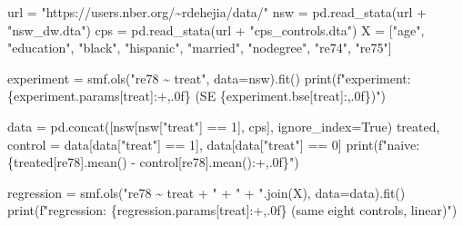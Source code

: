 \documentclass[
  letterpaper,
  10pt,
  twoside,
  openright,
  numbers=noenddot,
  chapterprefix=true]{scrbook}
\newenvironment{Shaded}{}{}
\newcommand{\BuiltInTok}[1]{\textcolor[rgb]{0.84,0.23,0.29}{#1}}
\newcommand{\DecValTok}[1]{\textcolor[rgb]{0.00,0.36,0.77}{#1}}
\newcommand{\NormalTok}[1]{\textcolor[rgb]{0.14,0.16,0.18}{#1}}
\newcommand{\OperatorTok}[1]{\textcolor[rgb]{0.14,0.16,0.18}{#1}}
\newcommand{\SpecialCharTok}[1]{\textcolor[rgb]{0.00,0.36,0.77}{#1}}
\newcommand{\SpecialStringTok}[1]{\textcolor[rgb]{0.01,0.18,0.38}{#1}}
\newcommand{\StringTok}[1]{\textcolor[rgb]{0.01,0.18,0.38}{#1}}
\newcommand{\VariableTok}[1]{\textcolor[rgb]{0.89,0.38,0.04}{#1}}
\begin{document}
\label{check-nsw-naive}
\begin{Shaded}
\begin{Highlighting}[]
\NormalTok{url }\OperatorTok{=} \StringTok{"https://users.nber.org/\textasciitilde{}rdehejia/data/"}
\NormalTok{nsw }\OperatorTok{=}\NormalTok{ pd.read\_stata(url }\OperatorTok{+} \StringTok{"nsw\_dw.dta"}\NormalTok{)}
\NormalTok{cps }\OperatorTok{=}\NormalTok{ pd.read\_stata(url }\OperatorTok{+} \StringTok{"cps\_controls.dta"}\NormalTok{)}
\NormalTok{X }\OperatorTok{=}\NormalTok{ [}\StringTok{"age"}\NormalTok{, }\StringTok{"education"}\NormalTok{, }\StringTok{"black"}\NormalTok{, }\StringTok{"hispanic"}\NormalTok{, }\StringTok{"married"}\NormalTok{, }\StringTok{"nodegree"}\NormalTok{, }\StringTok{"re74"}\NormalTok{, }\StringTok{"re75"}\NormalTok{]}

\NormalTok{experiment }\OperatorTok{=}\NormalTok{ smf.ols(}\StringTok{"re78 \textasciitilde{} treat"}\NormalTok{, data}\OperatorTok{=}\NormalTok{nsw).fit()}
\BuiltInTok{print}\NormalTok{(}\SpecialStringTok{f"experiment:  }\SpecialCharTok{\{}\NormalTok{experiment}\SpecialCharTok{.}\NormalTok{params[}\StringTok{\textquotesingle{}treat\textquotesingle{}}\NormalTok{]}\SpecialCharTok{:+,.0f\}}\SpecialStringTok{  (SE }\SpecialCharTok{\{}\NormalTok{experiment}\SpecialCharTok{.}\NormalTok{bse[}\StringTok{\textquotesingle{}treat\textquotesingle{}}\NormalTok{]}\SpecialCharTok{:,.0f\}}\SpecialStringTok{)"}\NormalTok{)}

\NormalTok{data }\OperatorTok{=}\NormalTok{ pd.concat([nsw[nsw[}\StringTok{"treat"}\NormalTok{] }\OperatorTok{==} \DecValTok{1}\NormalTok{], cps], ignore\_index}\OperatorTok{=}\VariableTok{True}\NormalTok{)}
\NormalTok{treated, control }\OperatorTok{=}\NormalTok{ data[data[}\StringTok{"treat"}\NormalTok{] }\OperatorTok{==} \DecValTok{1}\NormalTok{], data[data[}\StringTok{"treat"}\NormalTok{] }\OperatorTok{==} \DecValTok{0}\NormalTok{]}
\BuiltInTok{print}\NormalTok{(}\SpecialStringTok{f"naive:       }\SpecialCharTok{\{}\NormalTok{treated[}\StringTok{\textquotesingle{}re78\textquotesingle{}}\NormalTok{]}\SpecialCharTok{.}\NormalTok{mean() }\OperatorTok{{-}}\NormalTok{ control[}\StringTok{\textquotesingle{}re78\textquotesingle{}}\NormalTok{]}\SpecialCharTok{.}\NormalTok{mean()}\SpecialCharTok{:+,.0f\}}\SpecialStringTok{"}\NormalTok{)}

\NormalTok{regression }\OperatorTok{=}\NormalTok{ smf.ols(}\StringTok{"re78 \textasciitilde{} treat + "} \OperatorTok{+} \StringTok{" + "}\NormalTok{.join(X), data}\OperatorTok{=}\NormalTok{data).fit()}
\BuiltInTok{print}\NormalTok{(}\SpecialStringTok{f"regression:  }\SpecialCharTok{\{}\NormalTok{regression}\SpecialCharTok{.}\NormalTok{params[}\StringTok{\textquotesingle{}treat\textquotesingle{}}\NormalTok{]}\SpecialCharTok{:+,.0f\}}\SpecialStringTok{   (same eight controls, linear)"}\NormalTok{)}


\end{Highlighting}
\end{Shaded}
\end{document}
